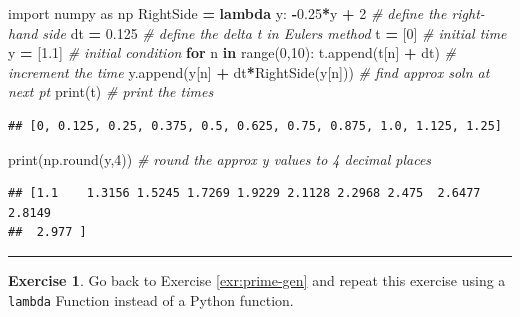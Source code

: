 \documentclass[
]{book}
\newenvironment{Shaded}{\begin{snugshade}}{\end{snugshade}}
\newcommand{\BuiltInTok}[1]{#1}
\newcommand{\CommentTok}[1]{\textcolor[rgb]{0.56,0.35,0.01}{\textit{#1}}}
\newcommand{\ControlFlowTok}[1]{\textcolor[rgb]{0.13,0.29,0.53}{\textbf{#1}}}
\newcommand{\DecValTok}[1]{\textcolor[rgb]{0.00,0.00,0.81}{#1}}
\newcommand{\FloatTok}[1]{\textcolor[rgb]{0.00,0.00,0.81}{#1}}
\newcommand{\ImportTok}[1]{#1}
\newcommand{\KeywordTok}[1]{\textcolor[rgb]{0.13,0.29,0.53}{\textbf{#1}}}
\newcommand{\NormalTok}[1]{#1}
\newcommand{\OperatorTok}[1]{\textcolor[rgb]{0.81,0.36,0.00}{\textbf{#1}}}
\theoremstyle{definition}
\theoremstyle{definition}
\theoremstyle{definition}
\newtheorem{exercise}{Exercise}[chapter]
\theoremstyle{remark}
\begin{document}
\begin{Shaded}
\begin{Highlighting}[]
\ImportTok{import}\NormalTok{ numpy }\ImportTok{as}\NormalTok{ np}
\NormalTok{RightSide }\OperatorTok{=} \KeywordTok{lambda}\NormalTok{ y: }\OperatorTok{{-}}\FloatTok{0.25}\OperatorTok{*}\NormalTok{y }\OperatorTok{+} \DecValTok{2} \CommentTok{\# define the right{-}hand side}
\NormalTok{dt }\OperatorTok{=} \FloatTok{0.125} \CommentTok{\# define the delta t in Euler\textquotesingle{}s method}
\NormalTok{t }\OperatorTok{=}\NormalTok{ [}\DecValTok{0}\NormalTok{] }\CommentTok{\# initial time}
\NormalTok{y }\OperatorTok{=}\NormalTok{ [}\FloatTok{1.1}\NormalTok{] }\CommentTok{\# initial condition}
\ControlFlowTok{for}\NormalTok{ n }\KeywordTok{in} \BuiltInTok{range}\NormalTok{(}\DecValTok{0}\NormalTok{,}\DecValTok{10}\NormalTok{):}
\NormalTok{    t.append(t[n] }\OperatorTok{+}\NormalTok{ dt) }\CommentTok{\# increment the time}
\NormalTok{    y.append(y[n] }\OperatorTok{+}\NormalTok{ dt}\OperatorTok{*}\NormalTok{RightSide(y[n])) }\CommentTok{\# find approx soln at next pt}
\BuiltInTok{print}\NormalTok{(t) }\CommentTok{\# print the times}
\end{Highlighting}
\end{Shaded}

\begin{verbatim}
## [0, 0.125, 0.25, 0.375, 0.5, 0.625, 0.75, 0.875, 1.0, 1.125, 1.25]
\end{verbatim}

\begin{Shaded}
\begin{Highlighting}[]
\BuiltInTok{print}\NormalTok{(np.}\BuiltInTok{round}\NormalTok{(y,}\DecValTok{4}\NormalTok{)) }\CommentTok{\# round the approx y values to 4 decimal places}
\end{Highlighting}
\end{Shaded}

\begin{verbatim}
## [1.1    1.3156 1.5245 1.7269 1.9229 2.1128 2.2968 2.475  2.6477 2.8149
##  2.977 ]
\end{verbatim}

\begin{center}\rule{0.5\linewidth}{0.5pt}\end{center}

\begin{exercise}
\protect\hypertarget{exr:unnamed-chunk-697}{}{\label{exr:unnamed-chunk-697} }Go back to Exercise \ref{exr:prime-gen} and repeat this exercise using a \texttt{lambda} Function instead of a Python function.
\end{exercise}
\end{document}
